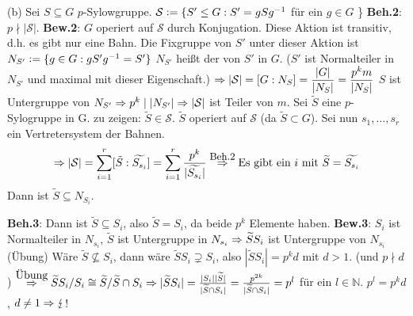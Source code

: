 \documentclass[a4paper,10pt,german]{scrbook}
\newcommand{\blitzb}[0]{\lightning}
\theoremstyle{saetze}
\theoremstyle{definitionen}
\begin{document}
{        \item[(b)] Sei $S \subseteq G$ $p$-Sylowgruppe. \newline
        $\mathcal{S} \mathrel{\mathop:}= \{S' \le G:S' = gSg^{-1}$ für ein $g \in G$ \}
        \newline
        \textbf{Beh.2}:
            $p \nmid |\mathcal{S}|$.
        \newline
        \textbf{Bew.2}:
            $G$ operiert auf $\mathcal{S}$ durch Konjugation. Diese Aktion ist
            transitiv, d.h. es gibt nur eine Bahn. Die Fixgruppe von $S'$ unter
            dieser Aktion ist $N_{S'} \mathrel{\mathop:}= \{g\in G: gS'g^{-1} = S'\}$
            \newline
            $N_{S'}$ heißt der  von $S'$ in $G$.\newline
            ($S'$ ist Normalteiler in $N_{S'}$ und maximal mit dieser
            Eigenschaft.) \newline
            $\displaystyle\Rightarrow |\mathcal{S}| = [G:N_{S}] = \frac{|G|}{|N_{S}|} =
            \frac{p^k m}{|N_{S}|}\\$ $S$ ist Untergruppe von $N_{S'} \Rightarrow p^k
            \mid |N_{S'}| \Rightarrow |\mathcal{S}|$ ist Teiler von $m$. \newline
            Sei $\widetilde{S}$ eine $p$-Sylogruppe in G. zu zeigen:
         $\widetilde{S} \in \mathcal{S}$. $\widetilde{S}$ operiert auf
         $\mathcal{S}$ (da $\tilde S \subset G$). Sei nun $s_1, \dots, s_r$ ein
         Vertretersystem der Bahnen. \[\displaystyle \Rightarrow |\mathcal{S}| = \sum_{i=1}^r
         [\tilde S : \widetilde{S_{s_i}}] = \sum_{i=1}^r
         \frac{p^k}{|\widetilde{S_{s_i}}|} \overset{\mbox{\small Beh.2}}{\Rightarrow}
         \mbox{Es gibt ein } i \mbox{ mit } \widetilde S = \widetilde{S_{s_i}}\]
         Dann ist $\widetilde{S} \subseteq N_{S_i}$.
        
	\textbf{Beh.3}:
            Dann ist $\widetilde{S} \subseteq S_i$, also $\widetilde{S} = S_i$,
            da beide $p^k$ Elemente haben. \newline
        \textbf{Bew.3}:
            $S_i$ ist Normalteiler in $N_{s_i}$, $\tilde S$ ist Untergruppe in
            $N_{s_i} \Rightarrow \widetilde{S} S_i$ ist Untergruppe von $N_{s_i}$ (Übung) \newline
            Wäre $\widetilde{S} \not \subseteq S_i$, dann wäre $\widetilde{S}
            S_i \supsetneq S_i$, also $|\widetilde{S} S_i| = p^k d$ mit $d>1$.
            (und $p \nmid d$) \newline
            $\overset{\mbox{Übung}}{\Rightarrow} \widetilde{S} S_i / S_i \cong 
            \widetilde{S} / \widetilde{S} \cap S_i \Rightarrow |\widetilde{S} S_i| = 
            \frac{|S_i| |\widetilde{S}|}{|\widetilde{S} \cap S_i|} = 
            \frac{p^{2k}}{|\widetilde S \cap S_i|} = p^l$ für ein $l\in\mathbb N$. $p^l=p^k d$,
            $d \neq 1 \Ra \blitzb$!
    
}
\end{document}
